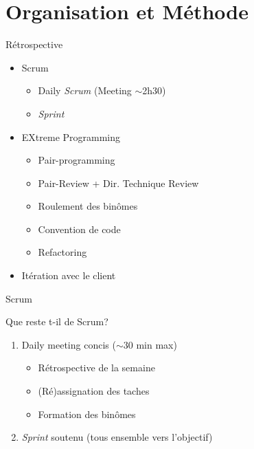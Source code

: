 \section{Organisation et Méthode}

\begin{frame}
  \begin{block}{Rétrospective}
    \begin{itemize}
      \item Scrum
        \begin{itemize}
          \item Daily \emph{Scrum} (Meeting $\sim$2h30)
          \item \emph{Sprint}
        \end{itemize}
      \item EXtreme Programming
        \begin{itemize}
          \item Pair-programming
          \item Pair-Review + Dir. Technique Review
          \item Roulement des binômes
          \item Convention de code
          \item Refactoring
        \end{itemize}
      \item Itération avec le client
   \end{itemize}
  \end{block}
\end{frame}

\begin{frame}{Scrum}
  \begin{block}{Que reste t-il de Scrum?}
    \begin{enumerate}
      \item Daily meeting concis ($\sim$30 min max)
        \begin{itemize}
          \item Rétrospective de la semaine
          \item (Ré)assignation des taches
          \item Formation des binômes
        \end{itemize}
      \item \emph{Sprint} soutenu (tous ensemble vers l'objectif)
    \end{enumerate}
  \end{block}
\end{frame}

